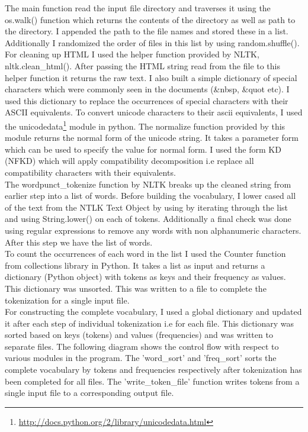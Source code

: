 \documentclass[11pt]{article} %
\begin{document}
The main function read the input file directory and traverses it using the os.walk() function which returns the contents of the directory as well as path to the directory. I appended the path to the file names and stored these in a list. Additionally I randomized the order of files in this list by using random.shuffle(). \\

For cleaning up HTML I used the helper function provided by NLTK, nltk.clean\_html(). After passing the HTML string read from the file  to this helper function it returns the raw text. I also built a simple dictionary of special characters which were commonly seen in the documents (\&nbsp, \&quot etc). I used this dictionary to replace the occurrences of special characters with their ASCII equivalents. To convert unicode characters to their ascii equivalents, I used the unicodedata\footnote{\url{http://docs.python.org/2/library/unicodedata.html}} module in python. The normalize function provided by this module returns the normal form of the unicode string. It takes a parameter form which can be used to specify the value for normal form. I used the form KD (NFKD) which will apply compatibility decomposition i.e replace all compatibility characters with their equivalents. \\

The wordpunct\_tokenize function by NLTK breaks up the cleaned string from earlier step into a list of words. Before building the vocabulary, I lower cased all of the text from the NTLK Text Object by using  by iterating through the list and using String.lower() on each of tokens. Additionally a final check was done using regular expressions to remove any words with non alphanumeric characters. After this step we have the list of words. \\   

To count the occurrences of each word in the list I used the Counter function from collections library in Python. It takes a list as input and returns a dictionary (Python object) with tokens as keys and their frequency as values. This dictionary was unsorted. This was written to a file to complete the tokenization for a single input file. \\

For constructing the complete vocabulary, I used a global dictionary and updated it after each step of individual tokenization i.e for each file. This dictionary was sorted based on keys (tokens) and values (frequencies) and was written to separate files. The following diagram shows the control flow with respect to various modules in the program. The 'word\_sort' and 'freq\_sort' sorts the complete vocabulary by tokens and frequencies respectively after tokenization has been completed for all files. The 'write\_token\_file' function writes tokens from a single input file to a corresponding output file. 
\end{document}
